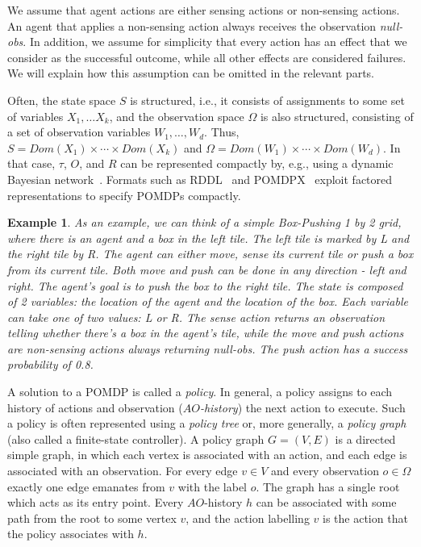 \documentclass[letterpaper]{article} %
\newtheorem{example}{Example}
\begin{document}
We assume that agent actions are either sensing actions or non-sensing actions. An agent that applies a non-sensing action always receives the observation {\em null-obs}. In addition, we assume for simplicity that every action has 
an effect 
that we consider as the successful outcome, while all other effects are considered failures. We will explain how this assumption can be omitted in the relevant parts.

Often, the state space $S$ is structured, i.e., it consists of assignments to some set of variables $X_1,\ldots X_k$, and the observation space $\Omega$ is
also structured, consisting of a set of observation variables $W_1,\ldots, W_d$. 
Thus, $S=Dom(X_1)\times\cdots\times Dom(X_k)$ and
$\Omega = Dom(W_1)\times\cdots\times Dom(W_d)$. 
In that case, $\tau$, $O$, and $R$ can be represented compactly by, e.g., using a dynamic Bayesian network~\cite{}. Formats such as RDDL~\cite{} and POMDPX~\cite{} exploit factored representations to specify POMDPs compactly.

\begin{example}
As an example, we can think of a simple Box-Pushing 1 by 2 grid, where there is an agent and a box in the left tile. The left tile is marked by \emph{L} and the right tile by \emph{R}. The agent can either move, sense its current tile or push a box from its current tile. Both move and push can be done in any direction - left and right. The agent's goal is to push the box to the right tile.
The state is composed of 2 variables: the location of the agent and the location of the box. Each variable can take one of two values: \emph{L} or \emph{R}.
The sense action returns an observation telling whether there's a box in the agent's tile, while the move and push actions are non-sensing actions always returning {\em null-obs}.
The push action has a success probability of 0.8.
\end{example}

A solution to a POMDP is called a {\em policy}. In general, a policy assigns to each history of actions and observation ({\em $AO$-history}) the next action to execute. 
Such a policy is often represented using a {\em policy tree} or, more generally, a {\em policy graph} (also called a finite-state controller). 
A policy graph $G=(V,E)$ is a directed simple graph, in which each vertex is associated with an action, and each edge is associated with an observation.
%
For every edge $v\in V$ and every observation $o\in\Omega$ exactly one edge emanates from $v$ with the label $o$.
The graph has a single root which acts as its entry point. Every $AO$-history $h$ can be associated with some path from the root to some vertex $v$,
and the action labelling $v$ is the action that the policy associates with $h$.
\end{document}
